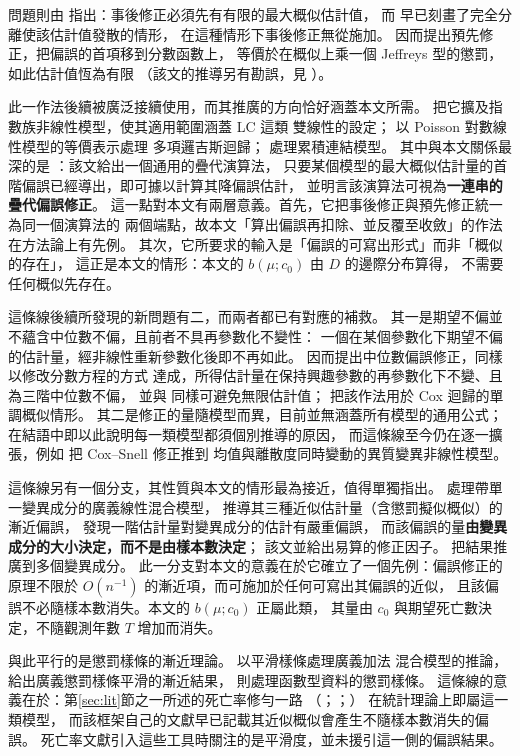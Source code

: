 \documentclass[UTF8, fontset=macnew, a4paper, 12pt]{ctexart}
\begin{document}
問題則由 \citet{firth1993} 指出：事後修正必須先有有限的最大概似估計值，
而 \citet{albert1984} 早已刻畫了完全分離使該估計值發散的情形，
在這種情形下事後修正無從施加。
\citet{firth1993} 因而提出預先修正，把偏誤的首項移到分數函數上，
等價於在概似上乘一個 Jeffreys 型的懲罰，如此估計值恆為有限
（該文的推導另有勘誤，見 \citealp{firth1995}）。

此一作法後續被廣泛接續使用，而其推廣的方向恰好涵蓋本文所需。
\citet{kosmidis2009} 把它擴及指數族非線性模型，使其適用範圍涵蓋 LC 這類
雙線性的設定；\citet{kosmidis2011} 以 Poisson 對數線性模型的等價表示處理
多項邏吉斯迴歸；\citet{kosmidis2014} 處理累積連結模型。
其中與本文關係最深的是 \citet{kosmidis2010}：該文給出一個通用的疊代演算法，
只要某個模型的最大概似估計量的首階偏誤已經導出，即可據以計算其降偏誤估計，
並明言該演算法可視為\textbf{一連串的疊代偏誤修正}。
這一點對本文有兩層意義。首先，它把事後修正與預先修正統一為同一個演算法的
兩個端點，故本文「算出偏誤再扣除、並反覆至收斂」的作法在方法論上有先例。
其次，它所要求的輸入是「偏誤的可寫出形式」而非「概似的存在」，
這正是本文的情形：本文的 $b(\mu;c_0)$ 由 $D$ 的邊際分布算得，
不需要任何概似先存在。

這條線後續所發現的新問題有二，而兩者都已有對應的補救。
其一是期望不偏並不蘊含中位數不偏，且前者不具再參數化不變性：
一個在某個參數化下期望不偏的估計量，經非線性重新參數化後即不再如此。
\citet{kennepagui2017} 因而提出中位數偏誤修正，同樣以修改分數方程的方式
達成，所得估計量在保持興趣參數的再參數化下不變、且為三階中位數不偏，
並與 \citet{firth1993} 同樣可避免無限估計值；
\citet{kennepagui2020} 把該作法用於 Cox 迴歸的單調概似情形。
其二是修正的量隨模型而異，目前並無涵蓋所有模型的通用公式；
\citet{cordeiro1991} 在結語中即以此說明每一類模型都須個別推導的原因，
而這條線至今仍在逐一擴張，例如 \citet{sossa2026} 把 Cox--Snell 修正推到
均值與離散度同時變動的異質變異非線性模型。

這條線另有一個分支，其性質與本文的情形最為接近，值得單獨指出。
\citet{breslow1995} 處理帶單一變異成分的廣義線性混合模型，
推導其三種近似估計量（含懲罰擬似概似）的漸近偏誤，
發現一階估計量對變異成分的估計有嚴重偏誤，
而該偏誤的量\textbf{由變異成分的大小決定，而不是由樣本數決定}；
該文並給出易算的修正因子。\citet{linbreslow1996} 把結果推廣到多個變異成分。
此一分支對本文的意義在於它確立了一個先例：偏誤修正的原理不限於
$O(n^{-1})$ 的漸近項，而可施加於任何可寫出其偏誤的近似，
且該偏誤不必隨樣本數消失。本文的 $b(\mu;c_0)$ 正屬此類，
其量由 $c_0$ 與期望死亡數決定，不隨觀測年數 $T$ 增加而消失。

與此平行的是懲罰樣條的漸近理論。\citet{lin1999} 以平滑樣條處理廣義加法
混合模型的推論，\citet{kauermann2009} 給出廣義懲罰樣條平滑的漸近結果，
\citet{xiao2020} 則處理函數型資料的懲罰樣條。
這條線的意義在於：第\ref{sec:lit}節之一所述的死亡率修勻一路
（\citealp{currie2004}；\citealp{delwarde2007}；\citealp{currie2013}）
在統計理論上即屬這一類模型，
而該框架自己的文獻早已記載其近似概似會產生不隨樣本數消失的偏誤。
死亡率文獻引入這些工具時關注的是平滑度，並未援引這一側的偏誤結果。
\end{document}
